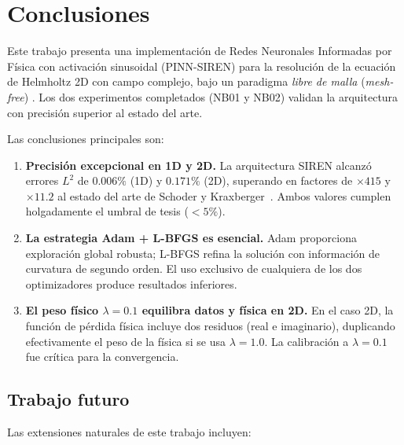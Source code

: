 
\section{Conclusiones}
\label{sec:conclusiones}

Este trabajo presenta una implementación de Redes Neuronales Informadas por Física
con activación sinusoidal (PINN-SIREN) para la resolución de la ecuación de Helmholtz
2D con campo complejo, bajo un paradigma \textit{libre de malla} (\textit{mesh-free})
\cite{Karniadakis2021_review,Cuomo2022_review}.
Los dos experimentos completados (NB01 y NB02) validan la arquitectura con precisión
superior al estado del arte.

Las conclusiones principales son:

\begin{enumerate}
  \item \textbf{Precisión excepcional en 1D y 2D.}
    La arquitectura SIREN alcanzó errores $L^2$ de $0.006\%$ (1D) y $0.171\%$ (2D),
    superando en factores de $\times 415$ y $\times 11.2$ al estado del arte de
    Schoder y Kraxberger~\cite{Schoder2024_PINN_acoustics}.
    Ambos valores cumplen holgadamente el umbral de tesis ($< 5\%$).

  \item \textbf{La estrategia Adam + L-BFGS es esencial.}
    Adam proporciona exploración global robusta; L-BFGS refina la solución con
    información de curvatura de segundo orden.
    El uso exclusivo de cualquiera de los dos optimizadores produce resultados inferiores.

  \item \textbf{El peso físico $\lambda = 0.1$ equilibra datos y física en 2D.}
    En el caso 2D, la función de pérdida física incluye dos residuos (real e imaginario),
    duplicando efectivamente el peso de la física si se usa $\lambda = 1.0$.
    La calibración a $\lambda = 0.1$ fue crítica para la convergencia.
\end{enumerate}

\subsection*{Trabajo futuro}

Las extensiones naturales de este trabajo incluyen:

